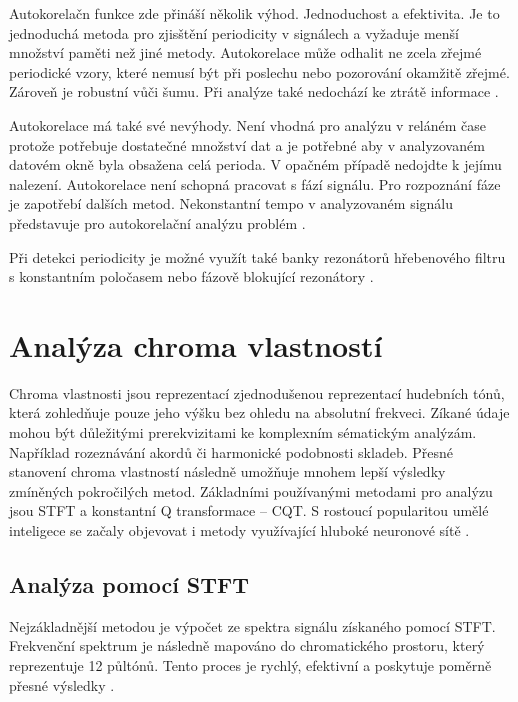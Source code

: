     Autokorelačn funkce zde přináší několik výhod. Jednoduchost a efektivita. Je to jednoduchá metoda pro zjisštění periodicity v signálech a vyžaduje menší množství paměti než jiné metody. Autokorelace může odhalit ne zcela zřejmé periodické vzory, které nemusí být při poslechu nebo pozorování okamžitě zřejmé. Zároveň je robustní vůči šumu. Při analýze také nedochází ke ztrátě informace \cite{Tempo_and_metrical_analzsis_by_tracking_multiple_metrical_levels_using_autocorrelation}.
    
    Autokorelace má také své nevýhody. Není vhodná pro analýzu v reláném čase protože potřebuje dostatečné množství dat a je potřebné aby v analyzovaném datovém okně byla obsažena celá perioda. V opačném případě nedojdte k jejímu nalezení. Autokorelace není schopná pracovat s fází signálu. Pro rozpoznání fáze je zapotřebí dalších metod. Nekonstantní tempo v analyzovaném signálu představuje pro autokorelační analýzu problém \cite{Tempo_and_metrical_analzsis_by_tracking_multiple_metrical_levels_using_autocorrelation}.

    Při detekci periodicity je možné využít také banky rezonátorů hřebenového filtru s konstantním poločasem \cite{Tempo_and_beat_analysis_of_acoustic_musical_signals} nebo fázově blokující rezonátory \cite{Resonance_and_the_perciption_of_musical_meter}.

\section{Analýza chroma vlastností} \label{sec:Chroma_vektory}
Chroma vlastnosti jsou reprezentací zjednodušenou reprezentací hudebních tónů, která zohledňuje pouze jeho výšku bez ohledu na absolutní frekveci. Zíkané údaje mohou být důležitými prerekvizitami ke komplexním sématickým analýzám. Například rozeznávání akordů či harmonické podobnosti skladeb. Přesné stanovení chroma vlastností následně umožňuje mnohem lepší výsledky zmíněných pokročilých metod. Základními používanými metodami pro analýzu jsou \acs{STFT} a konstantní Q transformace -- \acs{CQT}. S rostoucí popularitou umělé inteligece se začaly objevovat i metody využívající hluboké neuronové sítě \cite{Chroma_feature_extraction}. 

  \subsection{Analýza pomocí STFT}
  Nejzákladnější metodou je výpočet ze spektra signálu získaného pomocí \acs{STFT}. Frekvenční spektrum je následně mapováno do chromatického prostoru, který reprezentuje 12 půltónů. Tento proces je rychlý, efektivní a poskytuje poměrně přesné výsledky \cite{Tonal_description}. 
  
